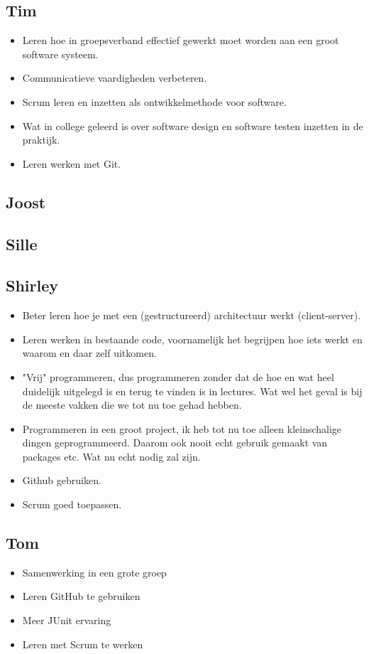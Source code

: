 \documentclass{article}
\begin{document}
\subsection*{Tim}
\begin{itemize}
	\item Leren hoe in groepsverband effectief gewerkt moet worden aan een groot software systeem.
	\item Communicatieve vaardigheden verbeteren.
	\item Scrum leren en inzetten als ontwikkelmethode voor software.
	\item Wat in college geleerd is over software design en software testen inzetten in de praktijk.
	\item Leren werken met Git.
\end{itemize}
\subsection*{Joost}
\subsection*{Sille}
\subsection*{Shirley}
	\begin{itemize}
	\item Beter leren hoe je met een (gestructureerd) architectuur werkt (client-server).
	\item Leren werken in bestaande code, voornamelijk het begrijpen hoe iets werkt en waarom en daar zelf uitkomen.
	\item "Vrij" programmeren, dus programmeren zonder dat de hoe en wat heel duidelijk uitgelegd is en terug te vinden is in lectures.
	Wat wel het geval is bij de meeste vakken die we tot nu toe gehad hebben.
	\item Programmeren in een groot project, ik heb tot nu toe alleen kleinschalige dingen geprogrammeerd. 
	Daarom ook nooit echt gebruik gemaakt van packages etc. Wat nu echt nodig zal zijn.
	\item Github gebruiken.
	\item Scrum goed toepassen.
\end{itemize}
\subsection*{Tom}
\begin{itemize}
	\item Samenwerking in een grote groep
	\item Leren GitHub te gebruiken
	\item Meer JUnit ervaring
	\item Leren met Scrum te werken
\end{itemize}
\end{document}
